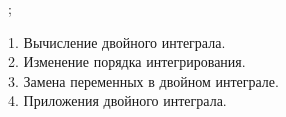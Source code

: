 
\newcommand{\polarFunction}{f \left(\rho \cdot \cos{\varphi}, \rho \cdot \sin{\varphi} \right)};
\newcommand{\polarJacobian}{\rho \ d\rho \ d\varphi}


1. Вычисление двойного интеграла. \\


2. Изменение порядка интегрирования. \\


3. Замена переменных в двойном интеграле. \\


4. Приложения двойного интеграла. \\

